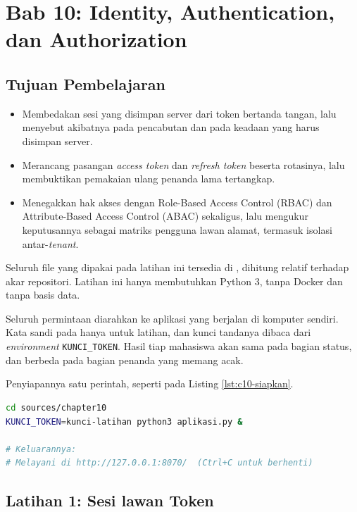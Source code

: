 \section{Bab 10: Identity, Authentication, dan Authorization}

\subsection*{Tujuan Pembelajaran}
\begin{itemize}
  \item Membedakan sesi yang disimpan server dari token bertanda tangan,
        lalu menyebut akibatnya pada pencabutan dan pada keadaan yang harus
        disimpan server.
  \item Merancang pasangan \textit{access token} dan \textit{refresh token}
        beserta rotasinya, lalu membuktikan pemakaian ulang penanda lama
        tertangkap.
  \item Menegakkan hak akses dengan Role-Based Access Control (RBAC) dan Attribute-Based Access Control (ABAC) sekaligus, lalu mengukur
        keputusannya sebagai matriks pengguna lawan alamat, termasuk isolasi
        antar-\textit{tenant}.
\end{itemize}

Seluruh file yang dipakai pada latihan ini tersedia di
, dihitung relatif terhadap akar repositori.
Latihan ini hanya membutuhkan Python 3, tanpa Docker dan tanpa basis data.

Seluruh permintaan diarahkan ke aplikasi yang berjalan di komputer sendiri.
Kata sandi pada  hanya untuk latihan,
dan kunci tandanya dibaca dari \textit{environment} \texttt{KUNCI\_TOKEN}.
Hasil tiap mahasiswa akan sama pada bagian status, dan berbeda pada bagian
penanda yang memang acak.

Penyiapannya satu perintah, seperti pada Listing \ref{lst:c10-siapkan}.

\begin{lstlisting}[language=bash, caption={Menyalakan aplikasi identitas, tersedia di \berkas{sources/chapter10/aplikasi.py}}, label={lst:c10-siapkan}]
cd sources/chapter10
KUNCI_TOKEN=kunci-latihan python3 aplikasi.py &

# Keluarannya:
# Melayani di http://127.0.0.1:8070/  (Ctrl+C untuk berhenti)
\end{lstlisting}

\subsection*{Latihan 1: Sesi lawan Token}


